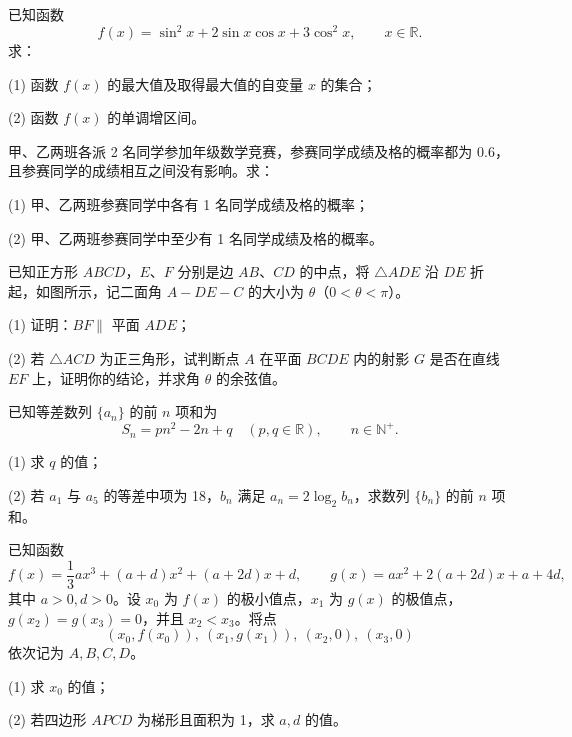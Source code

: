 \begin{question}
已知函数
\nopagebreak[4]
\[
f(x)=\sin^2x+2\sin x\cos x+3\cos^2x,\qquad x\in\mathbb R.
\]
求：

(1) 函数 \(f(x)\) 的最大值及取得最大值的自变量 \(x\) 的集合；

(2) 函数 \(f(x)\) 的单调增区间。

\end{question}
\begin{question}
甲、乙两班各派 2 名同学参加年级数学竞赛，参赛同学成绩及格的概率都为 0.6，且参赛同学的成绩相互之间没有影响。求：

(1) 甲、乙两班参赛同学中各有 1 名同学成绩及格的概率；

(2) 甲、乙两班参赛同学中至少有 1 名同学成绩及格的概率。

\Needspace{0.4\textheight}
\end{question}
\begin{question}
已知正方形 \(ABCD\)，\(E、F\) 分别是边 \(AB、CD\) 的中点，将 \(\triangle ADE\) 沿 \(DE\) 折起，如图所示，记二面角 \(A-DE-C\) 的大小为 \(\theta\)（\(0<\theta<\pi\)）。

(1) 证明：\(BF\parallel\) 平面 \(ADE\)；

(2) 若 \(\triangle ACD\) 为正三角形，试判断点 \(A\) 在平面 \(BCDE\) 内的射影 \(G\) 是否在直线 \(EF\) 上，证明你的结论，并求角 \(\theta\) 的余弦值。
\nopagebreak[4]
\begin{center}\end{center}
\nopagebreak[4]
\end{question}
\begin{question}
已知等差数列 \(\{a_n\}\) 的前 \(n\) 项和为
\nopagebreak[4]
\[
S_n=pn^2-2n+q\quad(p,q\in\mathbb R),\qquad n\in\mathbb N^+.
\]

(1) 求 \(q\) 的值；

(2) 若 \(a_1\) 与 \(a_5\) 的等差中项为 18，\(b_n\) 满足 \(a_n=2\log_2b_n\)，求数列 \(\{b_n\}\) 的前 \(n\) 项和。

\end{question}
\begin{question}
已知函数
\nopagebreak[4]
\[
f(x)=\frac13ax^3+(a+d)x^2+(a+2d)x+d,\qquad
g(x)=ax^2+2(a+2d)x+a+4d,
\]
其中 \(a>0,d>0\)。设 \(x_0\) 为 \(f(x)\) 的极小值点，\(x_1\) 为 \(g(x)\) 的极值点，\(g(x_2)=g(x_3)=0\)，并且 \(x_2<x_3\)。将点
\nopagebreak[4]
\[
(x_0,f(x_0)),\ (x_1,g(x_1)),\ (x_2,0),\ (x_3,0)
\]
依次记为 \(A,B,C,D\)。

(1) 求 \(x_0\) 的值；

(2) 若四边形 \(APCD\) 为梯形且面积为 1，求 \(a,d\) 的值。

\end{question}
